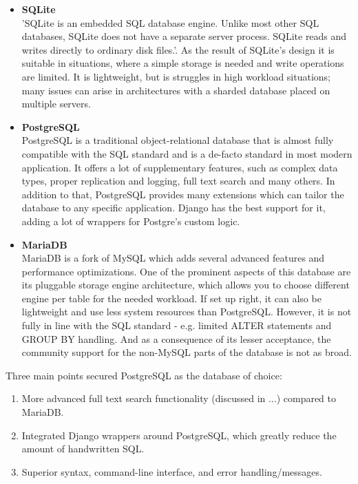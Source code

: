 \begin{itemize}
    \item \textbf{SQLite} \\
    'SQLite is an embedded SQL database engine.
    Unlike most other SQL databases, SQLite does not have a separate
    server process. SQLite reads and writes directly to ordinary disk
    files.'\cite{sqlite}. As the result of SQLite's design it is suitable
    in situations, where a simple storage is needed and write operations are limited.
    It is lightweight, but is struggles in high workload situations; many issues can arise
    in architectures with a sharded database placed on multiple servers.

    \item \textbf{PostgreSQL} \\
    PostgreSQL is a traditional object-relational database that is almost fully compatible with the SQL standard
    and is a de-facto standard in most modern application. It offers a lot of supplementary features,
    such as complex data types, proper replication and logging, full text search and many others.
    In addition to that, PostgreSQL provides many extensions which can tailor the database to any specific application.
    \cite{postgres}
    Django has the best support for it, adding a lot of wrappers for Postgre's custom logic.\cite{django_postgres}

    \item \textbf{MariaDB} \\
    MariaDB is a fork of MySQL which adds several advanced features and performance optimizations.
    One of the prominent aspects of this database are its pluggable storage engine architecture,
    which allows you to choose different engine per table for the needed workload.\cite{mariadb}
    If set up right, it can also be lightweight and use less system resources than PostgreSQL.
    However, it is not fully in line with the SQL standard -
    e.g. limited ALTER statements and GROUP BY handling\cite{dbfunctions}.
    And as a consequence of its lesser acceptance\cite{dbrank},
    the community support for the non-MySQL parts of the database is not as broad.
\end{itemize}
Three main points secured PostgreSQL as the database of choice:
\begin{enumerate}
    \item More advanced full text search functionality (discussed in ...) compared to MariaDB.
    \item Integrated Django wrappers around PostgreSQL, which greatly reduce the amount of handwritten SQL.
    \item Superior syntax, command-line interface, and error handling/messages.
\end{enumerate}


